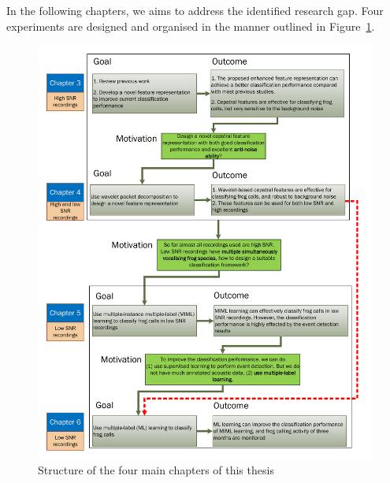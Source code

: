 In the following chapters, we aims to address the identified research gap. Four experiments are designed and organised in the manner outlined in Figure~\ref{fig:mainchapters}.


\begin{figure}[htb!]
\centering
\includegraphics[width=\textwidth]{image/Ch1/structure_chapters.pdf}
\caption[Structure of the four main chapters of this thesis]{Structure of the four main chapters of this thesis}
\label{fig:mainchapters}
\end{figure}








